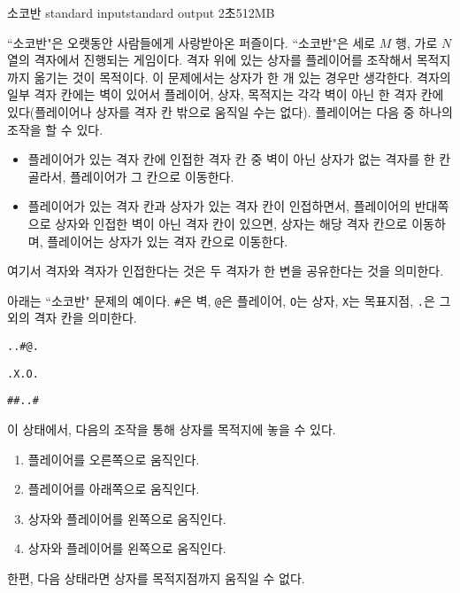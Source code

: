 \begin{problem}{소코반}
	{standard input}{standard output}
	{2초}{512MB}{}
	
	``소코반"은 오랫동안 사람들에게 사랑받아온 퍼즐이다.
	``소코반"은 세로 $M$ 행, 가로 $N$ 열의 격자에서 진행되는 게임이다. 격자 위에 있는 상자를 플레이어를 조작해서 목적지까지 옮기는 것이 목적이다. 이 문제에서는 상자가 한 개 있는 경우만 생각한다. 격자의 일부 격자 칸에는 벽이 있어서 플레이어, 상자, 목적지는 각각 벽이 아닌 한 격자 칸에 있다(플레이어나 상자를 격자 칸 밖으로 움직일 수는 없다). 플레이어는 다음 중 하나의 조작을 할 수 있다.
	
	\begin{itemize}
		\item 플레이어가 있는 격자 칸에 인접한 격자 칸 중 벽이 아닌 상자가 없는 격자를 한 칸 골라서, 플레이어가 그 칸으로 이동한다.
		
		\item 플레이어가 있는 격자 칸과 상자가 있는 격자 칸이 인접하면서, 플레이어의 반대쪽으로 상자와 인접한 벽이 아닌 격자 칸이 있으면, 상자는 해당 격자 칸으로 이동하며, 플레이어는 상자가 있는 격자 칸으로 이동한다.
	\end{itemize}

	여기서 격자와 격자가 인접한다는 것은 두 격자가 한 변을 공유한다는 것을 의미한다.
	
	아래는 ``소코반" 문제의 예이다. \texttt{\#}은 벽, \texttt{@}은 플레이어, \texttt{O}는 상자, \texttt{X}는 목표지점, \texttt{.}은 그 외의 격자 칸을 의미한다.
	
	\begin{center}
		
	\texttt{..\#@.}
	
	\texttt{.X.O.}
	
	\texttt{\#\#..\#}

	\end{center}
	
	이 상태에서, 다음의 조작을 통해 상자를 목적지에 놓을 수 있다.
	
	\begin{enumerate}
		\item 플레이어를 오른쪽으로 움직인다.
		\item 플레이어를 아래쪽으로 움직인다.
		\item 상자와 플레이어를 왼쪽으로 움직인다.
		\item 상자와 플레이어를 왼쪽으로 움직인다.
	\end{enumerate}
	
	
	한편, 다음 상태라면 상자를 목적지점까지 움직일 수 없다.
	

\end{problem}
